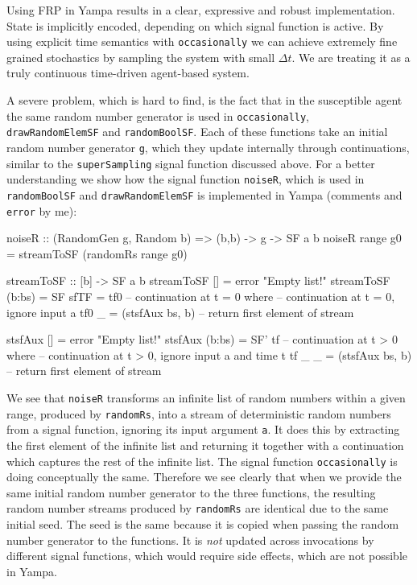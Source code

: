 Using FRP in Yampa results in a clear, expressive and robust implementation. State is implicitly encoded, depending on which signal function is active. By using explicit time semantics with \texttt{occasionally} we can achieve extremely fine grained stochastics by sampling the system with small $\Delta t$. We are treating it as a truly continuous time-driven agent-based system.

A severe problem, which is hard to find, is the fact that in the susceptible agent the same random number generator is used in \texttt{occasionally}, \\ \texttt{drawRandomElemSF} and \texttt{randomBoolSF}. Each of these functions take an initial random number generator \texttt{g}, which they update internally through continuations, similar to the \texttt{superSampling} signal function discussed above. For a better understanding we show how the signal function \texttt{noiseR}, which is used in \texttt{randomBoolSF} and \texttt{drawRandomElemSF} is implemented in Yampa (comments and \texttt{error} by me):

\begin{HaskellCode}
noiseR :: (RandomGen g, Random b) => (b,b) -> g -> SF a b
noiseR range g0 = streamToSF (randomRs range g0)

streamToSF :: [b] -> SF a b
streamToSF []     = error "Empty list!"
streamToSF (b:bs) = SF {sfTF = tf0} -- continuation at t = 0
  where
    -- continuation at t = 0, ignore input a
    tf0 _ = (stsfAux bs, b) -- return first element of stream
    
    stsfAux []     = error "Empty list!"
    stsfAux (b:bs) = SF' tf -- continuation at t > 0
      where
        -- continuation at t > 0, ignore input a and time t
        tf _ _ = (stsfAux bs, b) -- return first element of stream
\end{HaskellCode}

We see that \texttt{noiseR} transforms an infinite list of random numbers within a given range, produced by \texttt{randomRs}, into a stream of deterministic random numbers from a signal function, ignoring its input argument \texttt{a}. It does this by extracting the first element of the infinite list and returning it together with a continuation which captures the rest of the infinite list. The signal function \texttt{occasionally} is doing conceptually the same. Therefore we see clearly that when we provide the same initial random number generator to the three functions, the resulting random number streams produced by \texttt{randomRs} are identical due to the same initial seed. The seed is the same because it is copied when passing the random number generator to the functions. It is \textit{not} updated across invocations by different signal functions, which would require side effects, which are not possible in Yampa.

